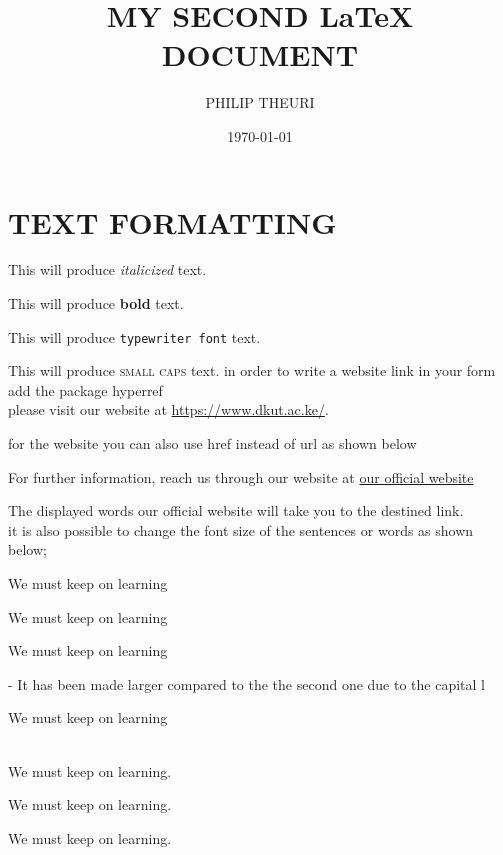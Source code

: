 \documentclass[a4paper,12pt]{article}
\title{MY SECOND \LaTeX{} DOCUMENT}
\author{PHILIP THEURI}
\date{\today}
\begin{document}
	
\tableofcontents	
\maketitle
	

\section{TEXT FORMATTING}
	
This will produce \textit{italicized} text.	
	
This will produce \textbf{bold} text.

This will produce \texttt{typewriter font} text.	
	
	This will produce \textsc{small caps} text.	
in order to write a website link in your form add the package hyperref\\	
please visit our website at \url{https://www.dkut.ac.ke/}.


for the website you can also use href instead of url as shown below

For further information, reach us through our website at \href{https://www.dkut.ac.ke/} {our official website}	
	
The displayed words our official website will take you to the destined link.\\[6pt]
it is also possible to change the font size of the sentences or words as shown below;


\begin{large}We must keep  on learning\end{large}

\begin{huge}We must keep  on learning\end{huge}

\begin{Large}We must keep  on learning\end{Large}- It has been made larger compared to the the second one due to the capital l


\begin{Huge}We must keep on learning\end{Huge}\\[0.01cm]

We must keep on learning.

\begin{small}We must keep on learning.\end{small}

\begin{scriptsize}We must keep on learning.\end{scriptsize}
\end{document}
